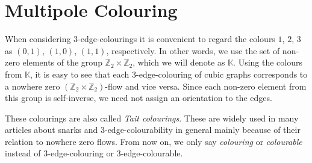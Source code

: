 \section{Multipole Colouring}\label{sec:multipole-colouring}


When considering $3$-edge-colourings it is convenient to regard the colours $1$, $2$, $3$ as $(0, 1)$, $(1, 0)$, $(1,1)$, respectively. In other words, we use the set of non-zero elements of the group $\mathbb{Z}_2\times\mathbb{Z}_2$, which we will denote as $\mathbb{K}$. Using the colours from $\mathbb{K}$, it is easy to see that each $3$-edge-colouring of cubic graphs corresponds to a nowhere zero $(\mathbb{Z}_2\times\mathbb{Z}_2)$-flow and vice versa. Since each non-zero element from this group is self-inverse, we need not assign an orientation to the edges.

	

These colourings are also called \textit{Tait colourings}. These are widely used in many articles about snarks and 3-edge-colourability in general mainly because of their relation to nowhere zero flows.
From now on, we only say \textit{colouring} or \textit{colourable} instead of $3$-edge-colouring or $3$-edge-colourable.

